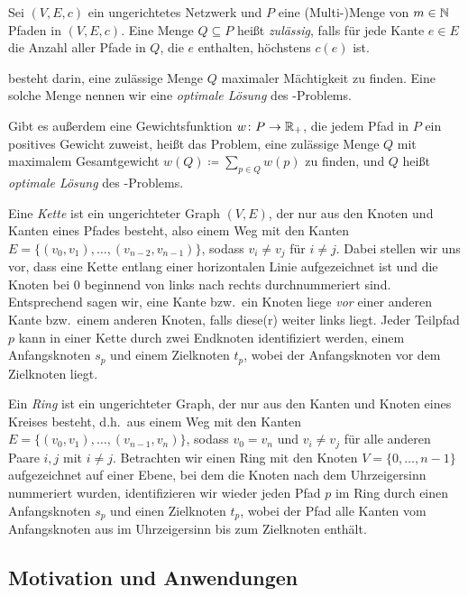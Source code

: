 \begin{definition}
    Sei $(V,E,c)$ ein ungerichtetes Netzwerk und $P$ eine (Multi-)Menge von $m \in \mathbb N$ Pfaden in $(V,E,c)$.
    Eine Menge $Q \subseteq P$ heißt {\em zulässig}, falls für jede Kante $e \in E$ die Anzahl aller Pfade in $Q$,
    die $e$ enthalten, höchstens $c(e)$ ist.
    
    {\em \CallControl} besteht darin, eine zulässige Menge $Q$ maximaler Mächtigkeit zu finden.
    Eine solche Menge nennen wir eine {\em optimale Lösung} des \CallControl-Problems.
    
    Gibt es außerdem eine Gewichtsfunktion $w \colon P \rightarrow \mathbb R_+$, die jedem Pfad in $P$ ein 
    positives Gewicht zuweist, heißt das Problem, eine zulässige Menge $Q$ mit maximalem Gesamtgewicht
    $w(Q) \coloneqq \sum_{p \in Q} w(p)$ zu finden, {\em \WeightedCallControl} und $Q$ heißt 
    {\em optimale Lösung} des \WeightedCallControl-Problems.
\end{definition}

Eine {\em Kette} ist ein ungerichteter Graph $(V,E)$, der nur aus den Knoten und Kanten eines Pfades besteht, also einem
Weg mit den Kanten $E=\{(v_0, v_1),\dots,(v_{n-2},v_{n-1})\}$, sodass $v_i \neq v_j$ für $i \neq j$.
Dabei stellen wir uns vor, dass eine Kette entlang einer horizontalen Linie aufgezeichnet ist und die
Knoten bei $0$ beginnend von links nach rechts durchnummeriert sind. 
Entsprechend sagen wir, eine Kante bzw.\ ein Knoten liege {\em vor} einer anderen Kante bzw.\ einem anderen Knoten, 
falls diese(r) weiter links liegt.
Jeder Teilpfad $p$ kann in einer Kette durch zwei Endknoten identifiziert werden, einem Anfangsknoten $s_p$ und einem 
Zielknoten $t_p$, wobei der Anfangsknoten vor dem Zielknoten liegt.

Ein {\em Ring} ist ein ungerichteter Graph, der nur aus den Kanten und Knoten eines Kreises besteht, d.h.\ aus einem Weg 
mit den Kanten $E=\{(v_0, v_1),\dots,(v_{n-1},v_{n})\}$, sodass $v_0 = v_n$ und $v_i \neq v_j$ für alle anderen Paare $i,j$ 
mit $i \neq j$.
Betrachten wir einen Ring mit den Knoten $V=\{0, \dots , n-1\}$ aufgezeichnet auf einer Ebene, bei dem die Knoten nach
dem Uhrzeigersinn nummeriert wurden, identifizieren wir wieder jeden Pfad $p$ im Ring durch einen Anfangsknoten $s_p$ und einen Zielknoten 
$t_p$, wobei der Pfad alle Kanten vom Anfangsknoten aus im Uhrzeigersinn bis zum Zielknoten enthält.

\subsection{Motivation und Anwendungen}\label{subsec:motivationUndAnwendungen}

